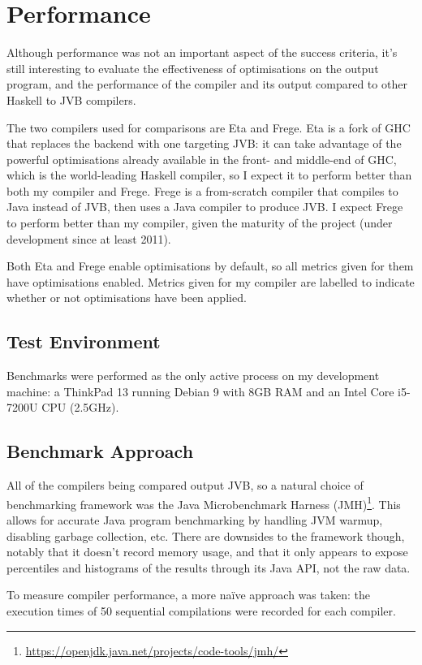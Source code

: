 \documentclass[dissertation.tex]{subfiles}
\begin{document}
\section{Performance}
{
    Although performance was not an important aspect of the success criteria, it's still interesting to evaluate the effectiveness of optimisations on the output program, and the performance of the compiler and its output compared to other Haskell to JVB compilers.

    The two compilers used for comparisons are Eta and Frege. Eta is a fork of GHC that replaces the backend with one targeting JVB: it can take advantage of the powerful optimisations already available in the front- and middle-end of GHC, which is the world-leading Haskell compiler, so I expect it to perform better than both my compiler and Frege. Frege is a from-scratch compiler that compiles to Java instead of JVB, then uses a Java compiler to produce JVB. I expect Frege to perform better than my compiler, given the maturity of the project (under development since at least 2011).

    Both Eta and Frege enable optimisations by default, so all metrics given for them have optimisations enabled. Metrics given for my compiler are labelled to indicate whether or not optimisations have been applied.

    \subsection{Test Environment}\label{sec:test-environment}
    {
        Benchmarks were performed as the only active process on my development machine: a ThinkPad 13 running Debian 9 with 8GB RAM and an Intel Core i5-7200U CPU (2.5GHz).
    }
    \subsection{Benchmark Approach}
    {
        All of the compilers being compared output JVB, so a natural choice of benchmarking framework was the Java Microbenchmark Harness (JMH)\footnote{\url{https://openjdk.java.net/projects/code-tools/jmh/}}. This allows for accurate Java program benchmarking by handling JVM warmup, disabling garbage collection, etc. There are downsides to the framework though, notably that it doesn't record memory usage, and that it only appears to expose percentiles and histograms of the results through its Java API, not the raw data.

        To measure compiler performance, a more naïve approach was taken: the execution times of 50 sequential compilations were recorded for each compiler.
        
}}
\end{document}
